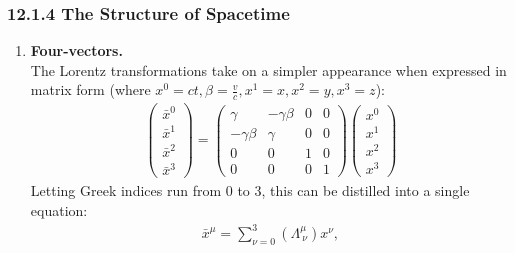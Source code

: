 \documentclass[11pt,letterpaper]{book}
\begin{document}
\subsubsection{12.1.4 The Structure of Spacetime}
    \begin{enumerate}
        \item \textbf{Four-vectors.} \\
            The Lorentz transformations take on a simpler appearance when expressed in matrix form (where $x^0=ct, \beta = \frac{v}{c}, x^1=x, x^2=y, x^3=z$): 
            \begin{align}
            \begin{pmatrix}
            \bar{x}^0 \\
            \bar{x}^1 \\
            \bar{x}^2 \\
            \bar{x}^3
            \end{pmatrix}
            =
            \begin{pmatrix}
            \gamma & -\gamma\beta & 0 & 0 \\
            -\gamma\beta & \gamma & 0 & 0 \\
            0 & 0 & 1 & 0 \\
            0 & 0 & 0 & 1
            \end{pmatrix}
            \begin{pmatrix}
            x^0 \\
            x^1 \\
            x^2 \\
            x^3
            \end{pmatrix}
            \end{align}   
            Letting Greek indices run from 0 to 3, this can be distilled into a single equation:
            \begin{align}
            \bar{x}^\mu = \sum_{\nu=0}^{3} (\Lambda^\mu_{\ \nu}) x^\nu,
            \end{align}
        

\end{enumerate}
\end{document}
